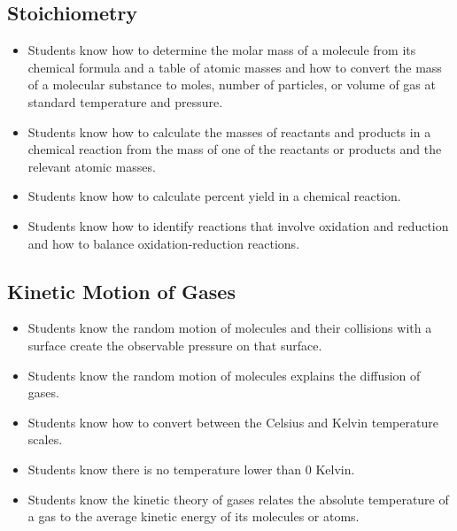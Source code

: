 \documentclass[11pt]{article}
\begin{document}
\subsection{Stoichiometry}
\label{sec:org980ed96}
\begin{itemize}
\item Students know how to determine the molar mass of a molecule from its chemical formula and a table of atomic masses and how to convert the mass of a molecular substance to moles, number of particles, or volume of gas at standard temperature and pressure.
\item Students know how to calculate the masses of reactants and products in a chemical reaction from the mass of one of the reactants or products and the relevant atomic masses.
\item Students know how to calculate percent yield in a chemical reaction.
\item Students know how to identify reactions that involve oxidation and reduction and how to balance oxidation-reduction reactions.
\end{itemize}
\subsection{Kinetic Motion of Gases}
\label{sec:org3195bbe}
\begin{itemize}
\item Students know the random motion of molecules and their collisions with a surface create the observable pressure on that surface.
\item Students know the random motion of molecules explains the diffusion of gases.
\item Students know how to convert between the Celsius and Kelvin temperature scales.
\item Students know there is no temperature lower than 0 Kelvin.
\item Students know the kinetic theory of gases relates the absolute temperature of a gas to the average kinetic energy of its molecules or atoms.
\end{itemize}
\end{document}
